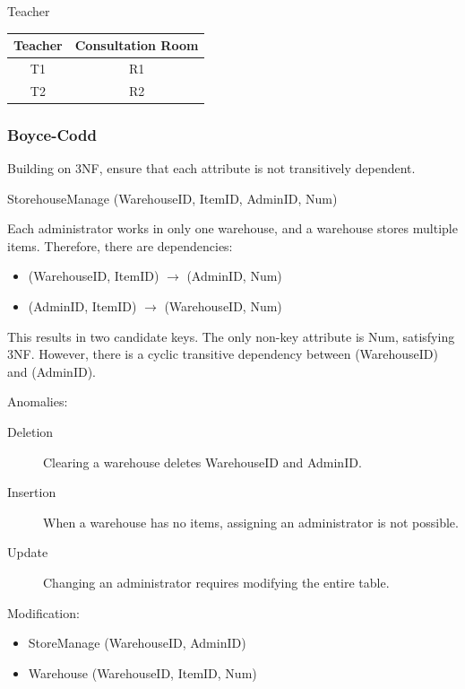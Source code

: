 \documentclass[11pt,journal,compsoc]{IEEEtran}
\begin{document}
Teacher

\begin{table}[H]
    \centering
    \begin{tabular}{|c|c|}
        \hline
        Teacher & Consultation Room \\
        \hline
        T1 & R1 \\
        T2 & R2 \\
        \hline
    \end{tabular}
\end{table}


\subsubsection{Boyce-Codd}

Building on 3NF, ensure that each attribute is not transitively dependent.

StorehouseManage (WarehouseID, ItemID, AdminID, Num)

Each administrator works in only one warehouse, and a warehouse stores multiple items. Therefore, there are dependencies:

\begin{itemize}
    \item (WarehouseID, ItemID) $\to$ (AdminID, Num)
    
    \item (AdminID, ItemID) $\to$ (WarehouseID, Num)
\end{itemize}

This results in two candidate keys. The only non-key attribute is Num, satisfying 3NF. However, there is a cyclic transitive dependency between (WarehouseID) and (AdminID).

Anomalies:

\begin{description}
    \item[Deletion] Clearing a warehouse deletes WarehouseID and AdminID.
    
    \item[Insertion] When a warehouse has no items, assigning an administrator is not possible.
    
    \item[Update] Changing an administrator requires modifying the entire table.
\end{description}

Modification:

\begin{itemize}
    \item StoreManage (WarehouseID, AdminID)
    
    \item Warehouse (WarehouseID, ItemID, Num)
\end{itemize}
\end{document}
